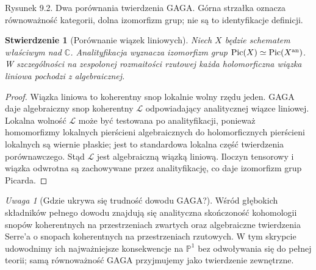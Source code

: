 \documentclass[11pt,a4paper,openany]{report}
\numberwithin{equation}{section}
\theoremstyle{plain}
\newtheorem{stwierdzenie}[twierdzenie]{Stwierdzenie}
\theoremstyle{definition}
\theoremstyle{remark}
\newtheorem{uwaga}[twierdzenie]{Uwaga}
\newcommand{\C}{\mathbb C}
\newcommand{\PP}{\mathbb P}
\begin{document}
\begin{center}

{\small Rysunek 9.2. Dwa porównania twierdzenia GAGA.
Górna strzałka oznacza równoważność kategorii, dolna
izomorfizm grup; nie są to identyfikacje definicji.}\par
\end{center}

\begin{stwierdzenie}[Porównanie wiązek liniowych]
Niech $X$ będzie schematem właściwym nad $\C$.
Analityfikacja wyznacza izomorfizm grup
$\operatorname{Pic}(X)\simeq\operatorname{Pic}(X^{\rm an})$.
W szczególności na zespolonej rozmaitości rzutowej
każda holomorficzna wiązka liniowa pochodzi z algebraicznej.
\end{stwierdzenie}
\begin{proof}
Wiązka liniowa to koherentny snop lokalnie wolny rzędu jeden.
GAGA daje algebraiczny snop koherentny $\mathcal L$ odpowiadający
analitycznej wiązce liniowej. Lokalna wolność $\mathcal L$
może być testowana po analityfikacji, ponieważ homomorfizmy
lokalnych pierścieni algebraicznych do holomorficznych
pierścieni lokalnych są wiernie płaskie; jest to standardowa
lokalna część twierdzenia porównawczego. Stąd $\mathcal L$
jest algebraiczną wiązką liniową. Iloczyn tensorowy
i wiązka odwrotna są zachowywane przez analityfikację,
co daje izomorfizm grup Picarda.
\end{proof}

\begin{uwaga}[Gdzie ukrywa się trudność dowodu GAGA?]
Wśród głębokich składników pełnego dowodu znajdują się
analityczna skończoność kohomologii snopów koherentnych
na przestrzeniach zwartych oraz algebraiczne twierdzenia
Serre'a o snopach koherentnych na przestrzeniach rzutowych.
W tym skrypcie udowodnimy ich najważniejsze konsekwencje
na $\PP^1$ bez odwoływania się do pełnej teorii; samą
równoważność GAGA przyjmujemy jako twierdzenie zewnętrzne.
\end{uwaga}
\end{document}
